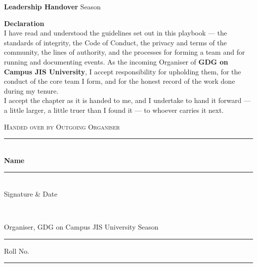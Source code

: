 \documentclass[11pt,a4paper]{article}
\begin{document}
\begin{center}
  {\large\bfseries\color{Ink}Leadership Handover}\qquad
  {\large\color{Slate}Season}\;
\end{center}
\vspace{14pt}

\begin{tcolorbox}[enhanced,colback=white,colframe=Line,boxrule=0.8pt,arc=5pt,
    left=18pt,right=18pt,top=16pt,bottom=16pt,borderline west={3.5pt}{0pt}{GBlue}]
  {\bfseries\large\color{Ink}Declaration}\\[6pt]
  I have read and understood the guidelines set out in this playbook — the standards of integrity, the
  Code of Conduct, the privacy and terms of the community, the lines of authority, and the processes
  for forming a team and for running and documenting events. As the incoming Organiser of
  \textbf{GDG on Campus JIS University}, I accept responsibility for upholding them, for the conduct of
  the core team I form, and for the honest record of the work done during my tenure.\\[6pt]
  I accept the chapter as it is handed to me, and I undertake to hand it forward — a little larger, a
  little truer than I found it — to whoever carries it next.
\end{tcolorbox}

\vspace{22pt}

\begin{tcolorbox}[enhanced,colback=Mist,colframe=Mist,arc=5pt,left=18pt,right=18pt,top=14pt,bottom=18pt]
  {\footnotesize\color{Slate}\textsc{Handed over by \;\textperiodcentered\; Outgoing Organiser}}\\[46pt]
  \begin{minipage}[b]{0.56\linewidth}{\color{Line}\rule{\linewidth}{0.6pt}}\\[3pt]\textbf{Name}\end{minipage}\hfill
  \begin{minipage}[b]{0.38\linewidth}{\color{Line}\rule{\linewidth}{0.6pt}}\\[3pt]{\small\color{Slate}Signature \& Date}\end{minipage}\\[12pt]
  {\small\color{Slate}Organiser, GDG on Campus JIS University \;\textperiodcentered\; Season \rule{2.2cm}{0.4pt} \;\textperiodcentered\; Roll No.\ \rule{2.6cm}{0.4pt}}
\end{tcolorbox}
\end{document}
